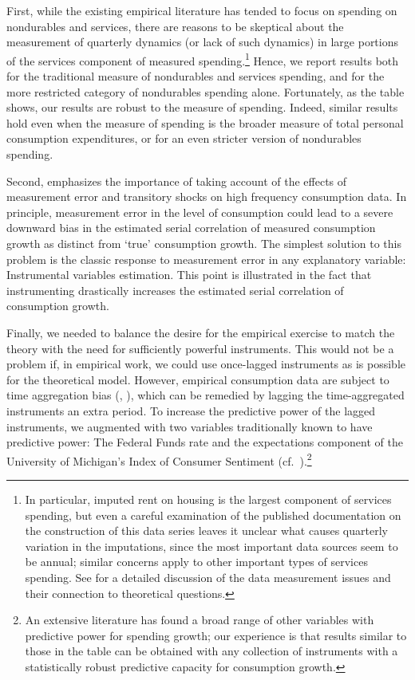 \documentclass[titlepage]{\econtex}\newcommand{\texname}{cAndCwithStickyE}
\begin{document}
First, while the existing empirical literature has tended to focus on spending on nondurables and services, there are reasons to be skeptical about the measurement of quarterly dynamics (or lack of such dynamics) in large portions of the services component of measured spending.\footnote{In particular, imputed rent on housing is the largest component of services spending, but even a careful examination of the published documentation on the construction of this data series leaves it unclear what causes quarterly variation in the imputations, since the most important data sources seem to be annual; similar concerns apply to other important types of services spending.  See \cite{wilcox:aer} for a detailed discussion of the data measurement issues and their connection to theoretical questions.}  Hence, we report results both for the traditional measure of nondurables and services spending, and for the more restricted category of nondurables spending alone.  Fortunately, as the table shows, our results are robust to the measure of spending.  Indeed, similar results hold even when the measure of spending is the broader measure of total personal consumption expenditures, or for an even stricter version of nondurables spending.

Second, \cite{som07} emphasizes the importance of taking account of the effects of measurement error and transitory shocks on high frequency consumption data.  In principle, measurement error in the level of consumption could lead to a severe downward bias in the estimated serial correlation of measured consumption growth as distinct from `true' consumption growth.  The simplest solution to this problem is the classic response to measurement error in any explanatory variable: Instrumental variables estimation.  This point is illustrated in the fact that instrumenting drastically increases the estimated serial correlation of consumption growth.

Finally, we needed to balance the desire for the empirical exercise to match the theory with the need for sufficiently powerful instruments.  This would not be a problem if, in empirical work, we could use once-lagged instruments as is possible for the theoretical model.  However, empirical consumption data are subject to time aggregation bias (\cite{workingTimeAgg}, \cite{cmModel}), which can be remedied by lagging the time-aggregated instruments an extra period.  To increase the predictive power of the lagged instruments, we augmented with two variables traditionally known to have predictive power: The Federal Funds rate and the expectations component of the University of Michigan's Index of Consumer Sentiment (cf.\ \cite{cfwSentiment}).\footnote{An extensive literature has found a broad range of other variables with predictive power for spending growth; our experience is that results similar to those in the table can be obtained with any collection of instruments with a statistically robust predictive capacity for consumption growth.}
\end{document}
